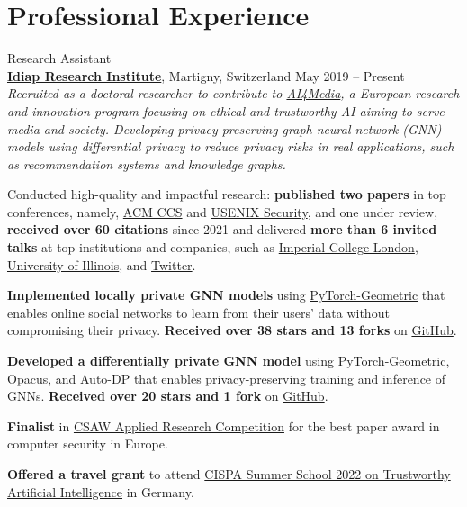 \documentclass[11pt]{article}
\begin{document}
\section{Professional Experience}

\begin{outerlist}

	\item {Research Assistant}\\
	\textbf{\href{https://idiap.ch}{Idiap Research Institute}}, Martigny, Switzerland \hfill {May 2019 -- Present}\\
  \textit{Recruited as a doctoral researcher to contribute to \href{https://www.ai4media.eu/}{AI4Media}, a European research and innovation program focusing on ethical and trustworthy AI aiming to serve media and society. Developing privacy-preserving graph neural network (GNN) models using differential privacy to reduce privacy risks in real applications, such as recommendation systems and knowledge graphs.}
	\begin{innerlist}
		\item Conducted high-quality and impactful research: \textbf{published two papers} in top conferences, namely, \href{https://www.sigsac.org/ccs/CCS2021/}{ACM CCS} and \href{https://www.usenix.org/conference/usenixsecurity23/}{USENIX Security}, and one under review, \textbf{received over 60 citations} since 2021 and delivered \textbf{more than 6 invited talks} at top institutions and companies, such as \href{https://ix.imperial.ac.uk/}{Imperial College London}, \href{https://cs.uic.edu/}{University of Illinois}, and \href{https://twitter.com/}{Twitter}.
		\item \textbf{Implemented locally private GNN models} using \href{https://www.pyg.org/}{PyTorch-Geometric} that enables online social networks to learn from their users' data without compromising their privacy. \textbf{Received over 38 stars and 13 forks} on \href{https://github.com/sisaman/LPGNN}{GitHub}.
		\item \textbf{Developed a differentially private GNN model} using \href{https://www.pyg.org/}{PyTorch-Geometric}, \href{https://opacus.ai/}{Opacus}, and \href{https://github.com/yuxiangw/autodp}{Auto-DP} that enables privacy-preserving training and inference of GNNs. \textbf{Received over 20 stars and 1 fork} on \href{https://github.com/sisaman/GAP}{GitHub}.
		\item \textbf{Finalist} in \href{https://www.csaw.io/research}{CSAW Applied Research Competition} for the best paper award in computer security in Europe.
		\item \textbf{Offered a travel grant} to attend \href{https://cispa.de/en/summer-school-2022}{CISPA Summer School 2022 on Trustworthy Artificial Intelligence} in Germany.
	\end{innerlist}


\end{outerlist}
\end{document}

